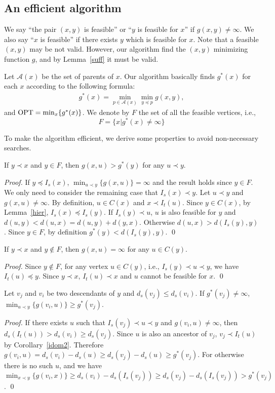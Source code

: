 \subsection{An efficient algorithm}
We say ``the pair $(x,y)$ is feasible'' or ``$y$ is feasible for $x$'' if $g(x,y)\neq\infty$. We also say ``$x$ is feasible'' if there exists $y$ which is feasible for $x$.
Note that a feasible $(x,y)$ may be not valid. However, our algorithm find the $(x,y)$ minimizing function $g$, and by Lemma~\ref{suff} it must be valid.

Let $\mathcal{A}(x)$ be the set of parents of $x$.
Our algorithm basically finds $g^*(x)$ for each $x$ according to the following formula: 
\begin{eqnarray}
g^*(x)=\min_{p\in \mathcal{A}(x)}\min_{y\preceq p}g(x,y), \label{allp}
\end{eqnarray}
and ${\rm OPT} =\min_x\{g^*(x)\}$.
We denote by $F$ the set of all the feasible vertices, i.e.,
\[ F=\{x|g^*(x)\neq \infty\} \]

 
To make the algorithm efficient, we derive some properties to avoid non-necessary searches.
\begin{lemma}\label{fp}
If $y\prec x$ and $y\in F$, then $g(x,u)>g^*(y)$ for any $u\prec y$.
\end{lemma}
\begin{proof}
If $y\preceq I_s(x)$, $\min_{u\prec y}\{g(x,u)\}=\infty$ and the result holds since $y\in F$.
We only need to consider the remaining case that $I_s(x)\prec y$.
Let $u\prec y$ and $g(x,u)\neq \infty$.
By definition, $u\in C(x)$ and $x\prec I_t(u)$.
Since $y\in C(x)$, by Lemma~\ref{hier}, $I_s(x)\preceq I_s(y)$. 
If $I_s(y)\prec u$, $u$ is also feasible for $y$ and $d(u,y)<d(u,x)=d(u,y)+d(y,x)$.
Otherwise $d(u,x)> d(I_s(y),y)$. Since $y\in F$, by definition $g^*(y)<d(I_s(y),y)$.
\qed\end{proof}
\begin{lemma}\label{nfp}
If $y\prec x$ and $y\notin F$, then $g(x,u)=\infty$ for any $u\in C(y)$.
\end{lemma}
\begin{proof}
Since $y\notin F$, for any vertex $u\in C(y)$, i.e., $I_s(y)\prec u\prec y$, we have $I_t(u)\preceq y$.
Since $y\prec x$,  $I_t(u)\prec x$ and $u$ cannot be feasible for $x$. 
\qed\end{proof}

\begin{lemma}\label{desf}
Let $v_j$ and $v_i$ be two descendants of $y$ and $d_s(v_j)\leq d_s(v_i)$.
If $g^*(v_j)\neq \infty$,  
$\min_{u\prec y}\{g(v_i,u)\}\geq g^*(v_j)$. 
\end{lemma}
\begin{proof}
If there exists $u$ such that $I_s(v_j)\prec u\prec y$ and $g(v_i,u)\neq \infty$, then $d_s(I_t(u))>d_s(v_i)\geq d_s(v_j)$. Since $u$ is also an ancestor of $v_j$, $v_j\prec I_t(u)$ by Corollary~\ref{idom2}. Therefore $g(v_i,u)=d_s(v_i)-d_s(u)\geq d_s(v_j)-d_s(u)\geq g^*(v_j)$.
For otherwise there is no such $u$, and we have $\min_{x\prec y}\{g(v_i,x)\}\geq d_s(v_i)-d_s(I_s(v_j))\geq d_s(v_j)-d_s(I_s(v_j))> g^*(v_j)$.
\qed\end{proof}

